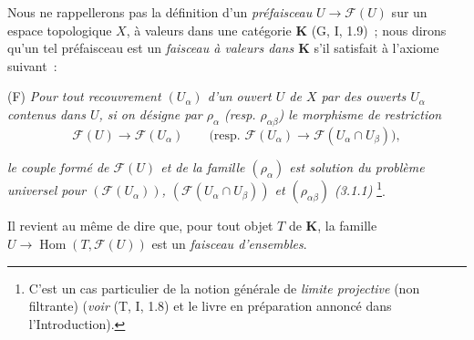 \begin{env}[3.1.2]
\label{0.3.1.2-fr}
Nous ne rappellerons pas la définition d'un \emph{préfaisceau}
$U\to\mathcal{F}(U)$ sur un espace topologique $X$, à valeurs dans une
catégorie $\mathbf{K}$ (G, I, 1.9)~; nous dirons qu'un tel préfaisceau est un
\emph{faisceau à valeurs dans $\mathbf{K}$} s'il satisfait à l'axiome
suivant~:

\smallskip
\noindent
\textup{(F)} \emph{Pour tout recouvrement $(U_\alpha)$ d'un ouvert $U$ de $X$
par des ouverts $U_\alpha$ contenus dans $U$, si on désigne par $\rho_\alpha$
(resp. $\rho_{\alpha\beta}$) le morphisme de restriction}
\[
  \mathcal{F}(U)\to\mathcal{F}(U_\alpha)
  \qquad
  \bigl(\text{resp. }\mathcal{F}(U_\alpha)
  \to\mathcal{F}(U_\alpha\cap U_\beta)\bigr),
\]


\emph{le couple formé de $\mathcal{F}(U)$ et de la famille $(\rho_\alpha)$ est
solution du problème universel pour $(\mathcal{F}(U_\alpha))$,
$(\mathcal{F}(U_\alpha\cap U_\beta))$ et $(\rho_{\alpha\beta})$ (3.1.1)}%
\footnote{C'est un cas particulier de la notion générale de \emph{limite
projective} (non filtrante) (\emph{voir} (T, I, 1.8) et le livre en préparation
annoncé dans l'Introduction).}.

Il revient au même de dire que, pour tout objet $T$ de $\mathbf{K}$, la
famille $U\to\operatorname{Hom}(T,\mathcal{F}(U))$ est un \emph{faisceau
d'ensembles}.
\end{env}

